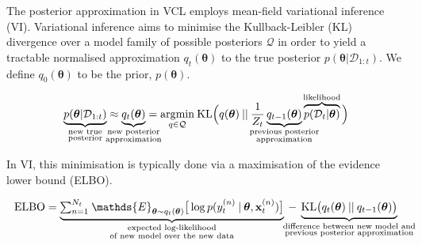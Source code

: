 \documentclass[a4paper,10pt]{article}
\let\boldtheta\theta %
\renewcommand{\theta}{\boldsymbol{\boldtheta}} %
\newcommand{\x}{\mathbf{x}}
\begin{document}
The posterior approximation in VCL employs mean-field variational inference (VI). Variational inference aims to minimise the Kullback-Leibler (KL) divergence over a model family of possible posteriors $\mathcal{Q}$ in order to yield a tractable normalised approximation $q_t(\theta)$ to the true posterior $p(\theta | \mathcal{D}_{1:t})$. We define $q_0(\theta)$ to be the prior, $p(\theta)$.

\vspace{-2.em}
\begin{equation}\label{eq:3}
\begin{split}
\underbrace{p(\theta | \mathcal{D}_{1:t})}_{\mathclap{\substack{\text{new true}\\ \text{posterior}}}}\approx \underbrace{q_t(\theta)}_{\mathclap{\substack{\text{new posterior}\\ \text{approximation}}}} &=\underset{q\in\mathcal{Q}}{\mathrm{arg}\mathrm{min}} \: \mathrm{KL}\Big(q(\theta)\:||\:\frac{1}{Z_t}\underbrace{q_{t-1}(\theta)}_{\mathclap{\substack{\text{previous posterior} \\ \text{approximation}}}}\overbrace{p(\mathcal{D}_t|\theta)}^{\mathclap{\text{likelihood}}} \Big)\\
\end{split}
\end{equation}

\vspace{-0.6em}
In VI, this minimisation is typically done via a maximisation of the evidence lower bound (ELBO). 

\vspace{-1.9em}
\begin{equation}\label{eq:4}
\begin{split}
\mathrm{ELBO}= \underbrace{{\textstyle\sum}_{n=1}^{N_t} \> \mathds{E}_{\theta \sim q_t(\theta)}\big[\log p(y_t^{(n)} \:| \:\theta, \x_t^{(n)})\big]}_{\substack{\text{expected log-likelihood}\\\text{of new model over the new data}}} \> -  \> \underbrace{\mathrm{KL}\big(q_t(\theta)\:||\:q_{t-1}(\theta)\big)}_{\mathclap{\substack{\text{difference between new model and}\\\text{previous posterior approximation}}}}
\end{split}
\end{equation} %
\end{document}
